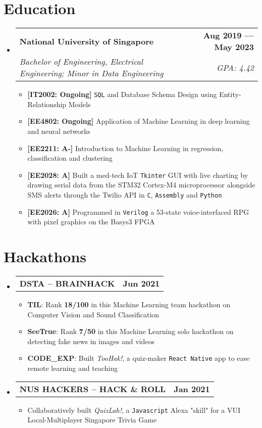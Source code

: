 \documentclass[letterpaper,11pt]{article}
\makeatletter
\newcommand{\resumeItem}[1]{
  \item\small{
    {#1 \vspace{0pt}}
  }
}
\newcommand{\resumeSubHeadingExtra}[4]{
  \vspace{2pt}\item
    \begin{tabular*}{0.97\textwidth}[t]{l@{\extracolsep{\fill}}r}
      \textbf{#1} & \textbf{#2} \\
      \textit{\small#3} & \textit{\small #4} \\
    \end{tabular*}\vspace{-7pt}
}
\newcommand{\resumeProjectHeading}[2]{
    \item
    \begin{tabular*}{0.97\textwidth}{l@{\extracolsep{\fill}}r}
      \small#1 & \textbf{#2} \\
    \end{tabular*}\vspace{-7pt}
}
\newcommand{\resumeSubHeadingListStart}{\begin{itemize}[leftmargin=0.15in, label={}]}
\newcommand{\resumeSubHeadingListEnd}{\end{itemize}}
\newcommand{\resumeItemListStart}{\begin{itemize}}
\newcommand{\resumeItemListEnd}{\end{itemize}\vspace{-5pt}}
\makeatother
\begin{document}
\section{Education}
  \resumeSubHeadingListStart
    \resumeSubHeadingExtra
      {National University of Singapore}{Aug 2019 --- May 2023}
      {Bachelor of Engineering, Electrical Engineering; Minor in Data Engineering}{GPA: 4.42}
      \resumeItemListStart
        \resumeItem{\textbf{[IT2002: Ongoing]} \texttt{SQL} and Database Schema Design using Entity-Relationship Models}
        \resumeItem{\textbf{[EE4802: Ongoing]} Application of Machine Learning in deep learning and neural networks}
          \resumeItem{\textbf{[EE2211: A-]} Introduction to Machine Learning in regression, classification and clustering}
        \resumeItem{\textbf{[EE2028: A]} Built a med-tech IoT \texttt{Tkinter} GUI with live charting by drawing serial data from the STM32 Cortex-M4 microprocessor alongside SMS alerts through the Twilio API in \texttt{C}, \texttt{Assembly} and \texttt{Python}}
        \resumeItem{\textbf{[EE2026: A]} Programmed in \texttt{Verilog} a 53-state voice-interfaced RPG with pixel graphics on the Basys3 FPGA}
      \resumeItemListEnd
  \resumeSubHeadingListEnd

\section{Hackathons}
  \resumeSubHeadingListStart
    \resumeProjectHeading
      {\textbf{DSTA -- BRAINHACK}}{Jun 2021}
      \resumeItemListStart
        \resumeItem{\textbf{TIL}: Rank \textbf{18/100} in this Machine Learning team hackathon on Computer Vision and Sound Classification}
        \resumeItem{\textbf{SeeTrue}: Rank \textbf{7/50} in this Machine Learning solo hackathon on detecting fake news in images and videos}
        \resumeItem{\textbf{CODE\_EXP}: Built \emph{TooHak!}, a quiz-maker \texttt{React Native} app to ease remote learning and teaching}
      \resumeItemListEnd
      \resumeProjectHeading
        {\textbf{NUS HACKERS -- HACK \& ROLL}}{Jan 2021}
        \resumeItemListStart
          \resumeItem{Collaboratively built \emph{QuizLah!}, a \texttt{Javascript} Alexa "skill" for a VUI Local-Multiplayer Singapore Trivia Game}
        \resumeItemListEnd
  \resumeSubHeadingListEnd

\end{document}
